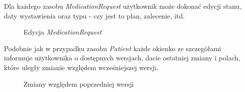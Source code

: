 \documentclass[a4paper]{article}
\begin{document}
Dla każdego zasobu \textit{MedicationRequest} użytkownik może dokonać edycji stanu, daty wystawienia oraz typu - czy jest to plan, zalecenie, itd.
\begin{figure}[H]
    \caption{Edycja \textit{MedicationRequest}}
\end{figure}

\pagebreak

Podobnie jak w przypadku zasobu \textit{Patient} każde okienko ze szczegółami informuje użytkownika o dostępnych wersjach, dacie ostatniej zmiany i polach, które
uległy zmianie względem wcześniejszej wersji.
\begin{figure}[H]
    \caption{Zmiany względem poprzedniej wersji}
\end{figure}
\end{document}
